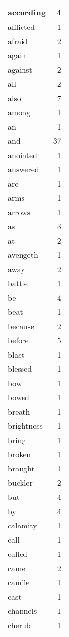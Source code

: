 \begin{center}
\begin{longtable}{l|r}
according & 4 \\ \hline
afflicted & 1 \\ \hline
afraid & 2 \\ \hline
again & 1 \\ \hline
against & 2 \\ \hline
all & 2 \\ \hline
also & 7 \\ \hline
among & 1 \\ \hline
an & 1 \\ \hline
and & 37 \\ \hline
anointed & 1 \\ \hline
answered & 1 \\ \hline
are & 1 \\ \hline
arms & 1 \\ \hline
arrows & 1 \\ \hline
as & 3 \\ \hline
at & 2 \\ \hline
avengeth & 1 \\ \hline
away & 2 \\ \hline
battle & 1 \\ \hline
be & 4 \\ \hline
beat & 1 \\ \hline
because & 2 \\ \hline
before & 5 \\ \hline
blast & 1 \\ \hline
blessed & 1 \\ \hline
bow & 1 \\ \hline
bowed & 1 \\ \hline
breath & 1 \\ \hline
brightness & 1 \\ \hline
bring & 1 \\ \hline
broken & 1 \\ \hline
brought & 1 \\ \hline
buckler & 2 \\ \hline
but & 4 \\ \hline
by & 4 \\ \hline
calamity & 1 \\ \hline
call & 1 \\ \hline
called & 1 \\ \hline
came & 2 \\ \hline
candle & 1 \\ \hline
cast & 1 \\ \hline
channels & 1 \\ \hline
cherub & 1 \\ \hline

\end{longtable}
\end{center}
